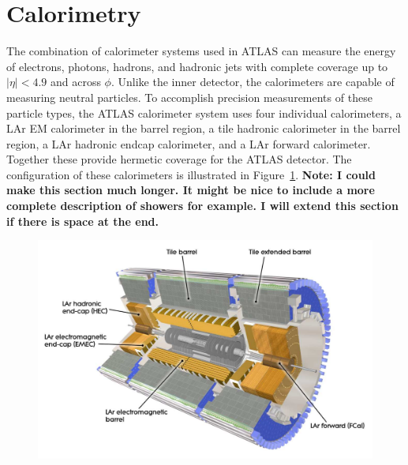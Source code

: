 
\section{Calorimetry}
\label{sec:calorimetry}

The combination of calorimeter systems used in \ac{ATLAS} can measure the energy of electrons, photons, hadrons, and hadronic jets with complete coverage up to $|\eta| < 4.9$ and across $\phi$.
Unlike the inner detector, the calorimeters are capable of measuring neutral particles.
To accomplish precision measurements of these particle types, the \ac{ATLAS} calorimeter system uses four individual calorimeters, a \ac{LAr} \acl{EM} calorimeter in the barrel region, a tile hadronic calorimeter in the barrel region, a \ac{LAr} hadronic endcap calorimeter, and a \ac{LAr} forward calorimeter.
Together these provide hermetic coverage for the \ac{ATLAS} detector.
The configuration of these calorimeters is illustrated in Figure~\ref{fig:calo_overview}. 
\textbf{Note: I could make this section much longer. It might be nice to include a more complete description of showers for example. I will extend this section if there is space at the end.}

\begin{figure}[hbtp]
\includegraphics[width=\fullfig]{figures/calo_overview.pdf}
\caption{}
\label{fig:calo_overview}
\end{figure}

